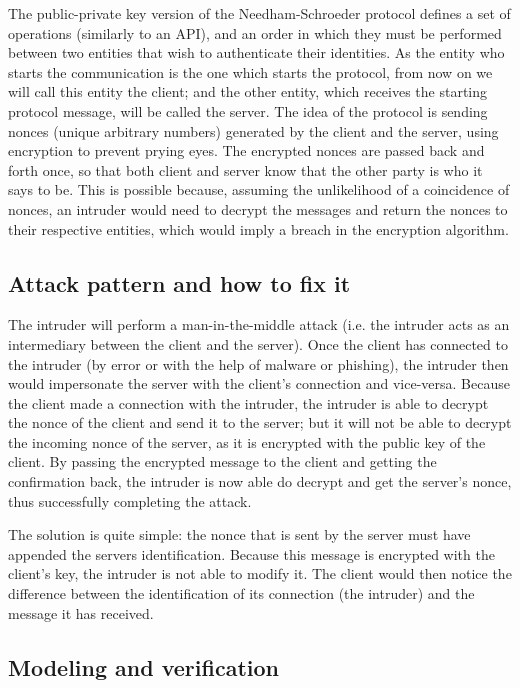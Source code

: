 \documentclass[11pt]{article}
\theoremstyle{definition}
\theoremstyle{plain}
\begin{document}
\begin{appendices}
The public-private key version of the Needham-Schroeder protocol defines a set of operations (similarly to an API), and an order in which they must be performed between two entities that wish to authenticate their identities. As the entity who starts the communication is the one which starts the protocol, from now on we will call this entity the client; and the other entity, which receives the starting protocol message, will be called the server. The idea of the protocol is sending nonces (unique arbitrary numbers) generated by the client and the server, using encryption to prevent prying eyes. The encrypted nonces are passed back and forth once, so that both client and server know that the other party is who it says to be. This is possible because, assuming the unlikelihood of a coincidence of nonces, an intruder would need to decrypt the messages and return the nonces to their respective entities, which would imply a breach in the encryption algorithm.

\subsection{Attack pattern and how to fix it}

The intruder will perform a man-in-the-middle attack (i.e. the intruder acts as an intermediary between the client and the server). Once the client has connected to the intruder (by error or with the help of malware or phishing), the intruder then would impersonate the server with the client's connection and vice-versa. Because the client made a connection with the intruder, the intruder is able to decrypt the nonce of the client and send it to the server; but it will not be able to decrypt the incoming nonce of the server, as it is encrypted with the public key of the client. By passing the encrypted message to the client and getting the confirmation back, the intruder is now able do decrypt and get the server's nonce, thus successfully completing the attack.

The solution is quite simple: the nonce that is sent by the server must have appended the servers identification. Because this message is encrypted with the client's key, the intruder is not able to modify it. The client would then notice the difference between the identification of its connection (the intruder) and the message it has received.

\subsection{Modeling and verification}


\end{appendices}
\end{document}
